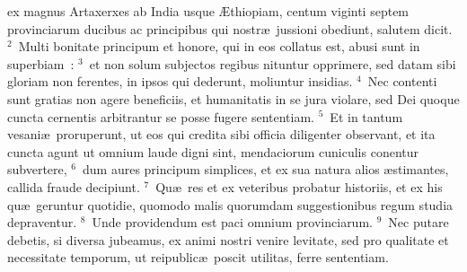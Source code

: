 \bchapter
{}ex magnus Artaxerxes ab India usque \AE thiopiam, centum viginti septem provinciarum ducibus ac principibus qui nostr\ae\ jussioni obediunt, salutem dicit.
${}^{2}$~Multi bonitate principum et honore, qui in eos collatus est, abusi sunt in superbiam~:
${}^{3}$~et non solum subjectos regibus nituntur opprimere, sed datam sibi gloriam non ferentes, in ipsos qui dederunt, moliuntur insidias.
${}^{4}$~Nec contenti sunt gratias non agere beneficiis, et humanitatis in se jura violare, sed Dei quoque cuncta cernentis arbitrantur se posse fugere sententiam.
${}^{5}$~Et in tantum vesani\ae\ proruperunt, ut eos qui credita sibi officia diligenter observant, et ita cuncta agunt ut omnium laude digni sint, mendaciorum cuniculis conentur subvertere,
${}^{6}$~dum aures principum simplices, et ex sua natura alios \ae stimantes, callida fraude decipiunt.
${}^{7}$~Qu\ae\ res et ex veteribus probatur historiis, et ex his qu\ae\ geruntur quotidie, quomodo malis quorumdam suggestionibus regum studia depraventur.
${}^{8}$~Unde providendum est paci omnium provinciarum.
${}^{9}$~Nec putare debetis, si diversa jubeamus, ex animi nostri venire levitate, sed pro qualitate et necessitate temporum, ut reipublic\ae\ poscit utilitas, ferre sententiam.


